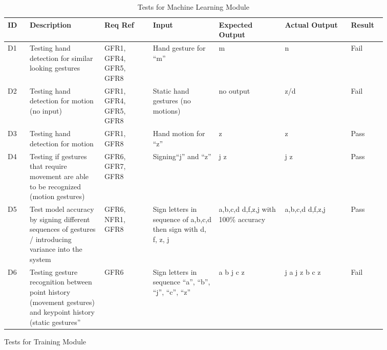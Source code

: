 \documentclass[12pt, titlepage]{article}
\begin{document}
\renewcommand{\arraystretch}{1.2}
\noindent \begin{longtable}{p{0.05\linewidth}|p{0.17\linewidth}|p{0.11\linewidth}|p{0.15\linewidth}|p{0.15\linewidth}|p{0.15\linewidth}|p{0.08\linewidth}}
\hline
\textbf{ID} & \textbf{Description} & \textbf{Req Ref} & \textbf{Input} & \textbf{Expected Output} & \textbf{Actual Output} & \textbf{Result}\\
\hline
D1 & Testing hand detection for similar looking gestures & GFR1, GFR4, GFR5, GFR8 & Hand gesture for “m” & m & n & Fail\\ \hline
D2 & Testing hand detection for motion (no input) & GFR1, GFR4, GFR5, GFR8 & Static hand gestures (no motions) & no output & z/d & Fail\\ \hline
D3 & Testing hand detection for motion & GFR1, GFR8 & Hand motion for “z” & z & z & Pass\\ \hline
D4 & Testing if gestures that require movement are able to be recognized (motion gestures) & GFR6, GFR7, GFR8 & Signing“j” and “z” & j z & j z & Pass\\ \hline
D5 & Test model accuracy by signing different sequences of gestures / introducing variance into the system & GFR6, NFR1, GFR8 & Sign letters in sequence of a,b,c,d then sign with d, f, z, j & a,b,c,d
d,f,z,j
with 100\% accuracy
 & a,b,c,d
d,f,z,j
 & Pass\\ \hline
D6 & Testing gesture recognition between point history (movement gestures) and keypoint history (static gestures” & GFR6 & Sign letters in sequence “a”, “b”, “j”, “c”, “z” & a b j c z & j a j z b c z & Fail
\hline
\caption{Tests for Machine Learning Module}
\end{longtable}

\newpage
\centerline{Tests for Training Module}
\end{document}
